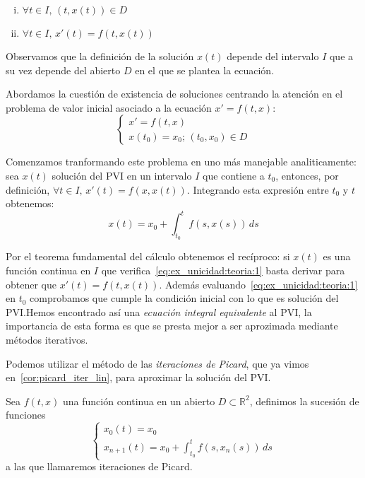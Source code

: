 \documentclass[../ecuaciones_diferenciales.tex]{subfiles}
\begin{document}
\begin{multicols}{2}
    \begin{enumerate}[(i)]
        \item \(\forall t \in I, \, (t, x(t)) \in D\)
        \item \(\forall t \in I, \, x'(t) = f(t, x(t))\)
    \end{enumerate}    
\end{multicols}

Observamos que la definición de la solución \(x(t)\) depende del intervalo \(I\) que a su vez
depende del abierto \(D\) en el que se plantea la ecuación.

Abordamos la cuestión de existencia de soluciones centrando la atención en el problema de valor inicial 
asociado a la ecuación \(x' = f(t, x)\):
\[
    \begin{cases}
        x' = f(t, x) \\
        x(t_0) = x_0; \, (t_0, x_0) \in D
    \end{cases}
\]

Comenzamos tranformando este problema en uno más manejable analiticamente: sea \(x(t)\) solución 
del PVI en un intervalo \(I\) que contiene a \(t_0\), entonces, por definición, \(\forall t \in I, \, x'(t) = f(x, x(t))\).
Integrando esta expresión entre \(t_0\) y \(t\) obtenemos:
\begin{equation}
    \label{eq:ex_unicidad:teoria:1}
    x(t) = x_0 + \int_{t_0}^t f(s, x(s)) \, ds
\end{equation}

Por el teorema fundamental del cálculo obtenemos el recíproco: si \(x(t)\) es una función continua en \(I\) que verifica~\ref{eq:ex_unicidad:teoria:1}
basta derivar para obtener que \(x'(t) = f(t, x(t))\). Además evaluando~\ref{eq:ex_unicidad:teoria:1} en \(t_0\) comprobamos
que cumple la condición inicial con lo que es solución del PVI.\@ Hemos encontrado así una \emph{ecuación integral equivalente} al PVI, la 
importancia de esta forma es que se presta mejor a ser aprozimada mediante métodos iterativos. 

Podemos utilizar el método de las \emph{iteraciones de Picard}, que ya vimos en~\ref{cor:picard_iter_lin}, para aproximar la solución del PVI.\@

\begin{definition}
Sea \(f(t, x)\) una función continua en un abierto \(D \subset \mathbb{R}^2\), definimos la sucesión de funciones
\begin{equation} \label{eq:ex_unicidad:teoria:2}
    \begin{cases}
        x_0(t) = x_0 \\
        x_{n+1}(t) = x_0 + \int_{t_0}^t f(s, x_n(s)) \, ds
    \end{cases}
\end{equation}
a las que llamaremos iteraciones de Picard.
\end{definition}
\end{document}
